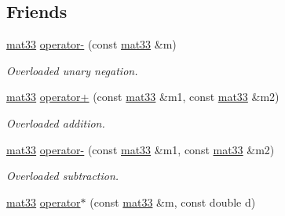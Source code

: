 \subsection*{\-Friends}
\begin{DoxyCompactItemize}
\item 
\hypertarget{classutil_1_1math_1_1mat33_ab65dfe6ab38be57b49c517e0283c521b}{\hyperlink{classutil_1_1math_1_1mat33}{mat33} \hyperlink{classutil_1_1math_1_1mat33_ab65dfe6ab38be57b49c517e0283c521b}{operator-\/} (const \hyperlink{classutil_1_1math_1_1mat33}{mat33} \&m)}\label{classutil_1_1math_1_1mat33_ab65dfe6ab38be57b49c517e0283c521b}

\begin{DoxyCompactList}\small\item\em \-Overloaded unary negation. \end{DoxyCompactList}\item 
\hypertarget{classutil_1_1math_1_1mat33_a6a1ab61692f696395129af5c074b16ef}{\hyperlink{classutil_1_1math_1_1mat33}{mat33} \hyperlink{classutil_1_1math_1_1mat33_a6a1ab61692f696395129af5c074b16ef}{operator+} (const \hyperlink{classutil_1_1math_1_1mat33}{mat33} \&m1, const \hyperlink{classutil_1_1math_1_1mat33}{mat33} \&m2)}\label{classutil_1_1math_1_1mat33_a6a1ab61692f696395129af5c074b16ef}

\begin{DoxyCompactList}\small\item\em \-Overloaded addition. \end{DoxyCompactList}\item 
\hypertarget{classutil_1_1math_1_1mat33_a667518a9ef5ed9979ce835cc60e24f49}{\hyperlink{classutil_1_1math_1_1mat33}{mat33} \hyperlink{classutil_1_1math_1_1mat33_a667518a9ef5ed9979ce835cc60e24f49}{operator-\/} (const \hyperlink{classutil_1_1math_1_1mat33}{mat33} \&m1, const \hyperlink{classutil_1_1math_1_1mat33}{mat33} \&m2)}\label{classutil_1_1math_1_1mat33_a667518a9ef5ed9979ce835cc60e24f49}

\begin{DoxyCompactList}\small\item\em \-Overloaded subtraction. \end{DoxyCompactList}\item 
\hypertarget{classutil_1_1math_1_1mat33_a1be11c8b6a31758e06d9d8b07420aa65}{\hyperlink{classutil_1_1math_1_1mat33}{mat33} \hyperlink{classutil_1_1math_1_1mat33_a1be11c8b6a31758e06d9d8b07420aa65}{operator$\ast$} (const \hyperlink{classutil_1_1math_1_1mat33}{mat33} \&m, const double d)}\label{classutil_1_1math_1_1mat33_a1be11c8b6a31758e06d9d8b07420aa65}


\end{DoxyCompactItemize}
